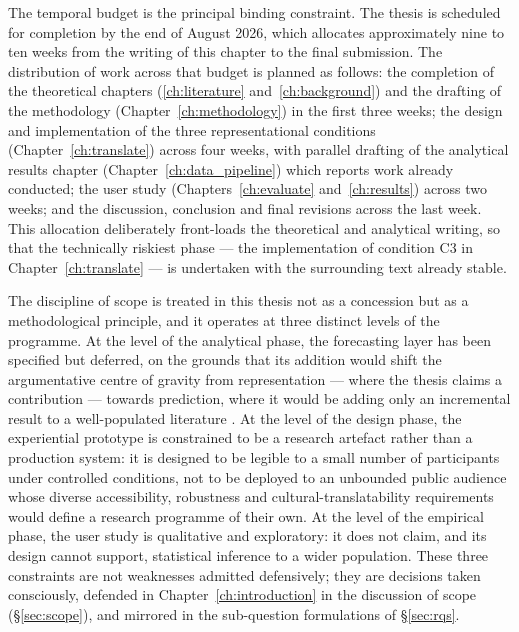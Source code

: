 The temporal budget is the principal binding constraint. The thesis is scheduled for completion by the end of August 2026, which allocates approximately nine to ten weeks from the writing of this chapter to the final submission. The distribution of work across that budget is planned as follows: the completion of the theoretical chapters (\ref{ch:literature} and~\ref{ch:background}) and the drafting of the methodology (Chapter~\ref{ch:methodology}) in the first three weeks; the design and implementation of the three representational conditions (Chapter~\ref{ch:translate}) across four weeks, with parallel drafting of the analytical results chapter (Chapter~\ref{ch:data_pipeline}) which reports work already conducted; the user study (Chapters~\ref{ch:evaluate} and~\ref{ch:results}) across two weeks; and the discussion, conclusion and final revisions across the last week. This allocation deliberately front-loads the theoretical and analytical writing, so that the technically riskiest phase --- the implementation of condition C3 in Chapter~\ref{ch:translate} --- is undertaken with the surrounding text already stable.

The discipline of scope is treated in this thesis not as a concession but as a methodological principle, and it operates at three distinct levels of the programme. At the level of the analytical phase, the forecasting layer has been specified but deferred, on the grounds that its addition would shift the argumentative centre of gravity from representation --- where the thesis claims a contribution --- towards prediction, where it would be adding only an incremental result to a well-populated literature \citep{sonnewald2021}. At the level of the design phase, the experiential prototype is constrained to be a research artefact rather than a production system: it is designed to be legible to a small number of participants under controlled conditions, not to be deployed to an unbounded public audience whose diverse accessibility, robustness and cultural-translatability requirements would define a research programme of their own. At the level of the empirical phase, the user study is qualitative and exploratory: it does not claim, and its design cannot support, statistical inference to a wider population. These three constraints are not weaknesses admitted defensively; they are decisions taken consciously, defended in Chapter~\ref{ch:introduction} in the discussion of scope (§\ref{sec:scope}), and mirrored in the sub-question formulations of §\ref{sec:rqs}.

